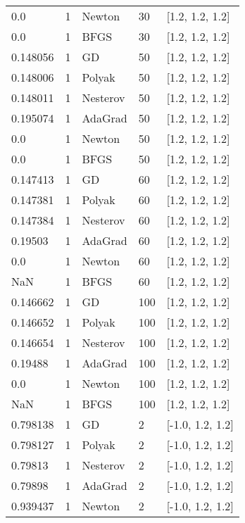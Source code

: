 \begin{tabular}{lllll}
       0.0 &        1 &   Newton &     30 &  [1.2, 1.2, 1.2] \\
       0.0 &        1 &     BFGS &     30 &  [1.2, 1.2, 1.2] \\
  0.148056 &        1 &       GD &     50 &  [1.2, 1.2, 1.2] \\
  0.148006 &        1 &   Polyak &     50 &  [1.2, 1.2, 1.2] \\
  0.148011 &        1 & Nesterov &     50 &  [1.2, 1.2, 1.2] \\
  0.195074 &        1 &  AdaGrad &     50 &  [1.2, 1.2, 1.2] \\
       0.0 &        1 &   Newton &     50 &  [1.2, 1.2, 1.2] \\
       0.0 &        1 &     BFGS &     50 &  [1.2, 1.2, 1.2] \\
  0.147413 &        1 &       GD &     60 &  [1.2, 1.2, 1.2] \\
  0.147381 &        1 &   Polyak &     60 &  [1.2, 1.2, 1.2] \\
  0.147384 &        1 & Nesterov &     60 &  [1.2, 1.2, 1.2] \\
   0.19503 &        1 &  AdaGrad &     60 &  [1.2, 1.2, 1.2] \\
       0.0 &        1 &   Newton &     60 &  [1.2, 1.2, 1.2] \\
       NaN &        1 &     BFGS &     60 &  [1.2, 1.2, 1.2] \\
  0.146662 &        1 &       GD &    100 &  [1.2, 1.2, 1.2] \\
  0.146652 &        1 &   Polyak &    100 &  [1.2, 1.2, 1.2] \\
  0.146654 &        1 & Nesterov &    100 &  [1.2, 1.2, 1.2] \\
   0.19488 &        1 &  AdaGrad &    100 &  [1.2, 1.2, 1.2] \\
       0.0 &        1 &   Newton &    100 &  [1.2, 1.2, 1.2] \\
       NaN &        1 &     BFGS &    100 &  [1.2, 1.2, 1.2] \\
  0.798138 &        1 &       GD &      2 & [-1.0, 1.2, 1.2] \\
  0.798127 &        1 &   Polyak &      2 & [-1.0, 1.2, 1.2] \\
   0.79813 &        1 & Nesterov &      2 & [-1.0, 1.2, 1.2] \\
   0.79898 &        1 &  AdaGrad &      2 & [-1.0, 1.2, 1.2] \\
  0.939437 &        1 &   Newton &      2 & [-1.0, 1.2, 1.2] \\

\end{tabular}
